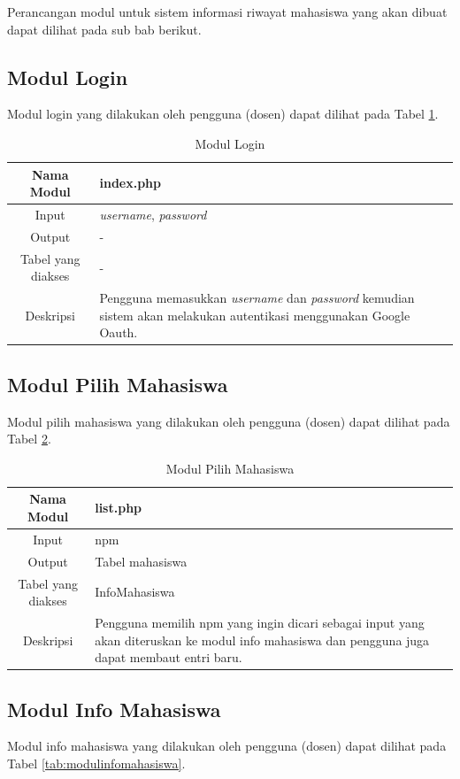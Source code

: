 Perancangan modul untuk sistem informasi riwayat mahasiswa yang akan dibuat
dapat dilihat pada sub bab berikut.

\subsection{Modul Login}
Modul login yang dilakukan oleh pengguna (dosen) dapat dilihat pada Tabel
\ref{tab:modullogin}.

\begin{table}[ht]
\centering
\caption[Tabel Modul Login]{Modul Login}
\label{tab:modullogin}
\begin{tabular}{|c|p{7cm}|}
\hline
Nama Modul & index.php\\
\hline
Input & {\it username}, {\it password}\\
\hline
Output & -\\
\hline
Tabel yang diakses & -\\
\hline
Deskripsi & Pengguna memasukkan {\it username} dan {\it password} kemudian
sistem akan melakukan autentikasi menggunakan Google Oauth.\\
\hline
\end{tabular}
\end{table}

\subsection{Modul Pilih Mahasiswa}
Modul pilih mahasiswa yang dilakukan oleh pengguna (dosen) dapat dilihat pada
Tabel \ref{tab:modulpilihmahasiswa}.

\begin{table}[ht]
\centering
\caption[Tabel Modul Pilih Mahasiswa]{Modul Pilih Mahasiswa}
\label{tab:modulpilihmahasiswa}
\begin{tabular}{|c|p{7cm}|}
\hline
Nama Modul & list.php\\
\hline
Input & npm\\
\hline
Output & Tabel mahasiswa\\
\hline
Tabel yang diakses & InfoMahasiswa\\
\hline
Deskripsi & Pengguna memilih npm yang ingin dicari sebagai input yang akan
diteruskan ke modul info mahasiswa dan pengguna juga dapat membaut entri baru.\\
\hline
\end{tabular}
\end{table}

\subsection{Modul Info Mahasiswa}
Modul info mahasiswa yang dilakukan oleh pengguna (dosen) dapat dilihat pada
Tabel \ref{tab:modulinfomahasiswa}.

